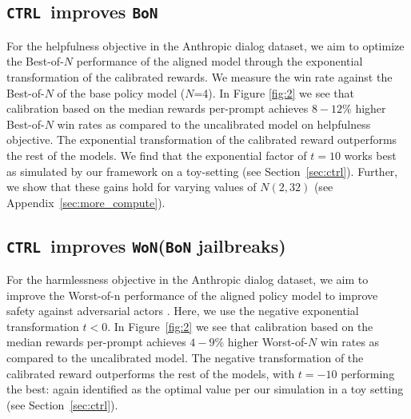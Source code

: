 \documentclass{article}
\newcommand{\ctrl}{\texttt{CTRL}\xspace}
\newcommand{\bofn}{\texttt{BoN}\xspace}
\newcommand{\wofn}{\texttt{WoN}\xspace}
\begin{document}
%
%
\subsection{\ctrl\ improves \bofn}
%
For the helpfulness objective in the Anthropic dialog dataset, we aim to optimize the Best-of-$N$ performance of the aligned model through the exponential transformation of the calibrated rewards. We measure the win rate against the Best-of-$N$ of the base policy model ($N$=4). In Figure \ref{fig:2} we see that calibration based on the median rewards per-prompt achieves $8-12\%$ higher Best-of-$N$ win rates as compared to the uncalibrated model on helpfulness objective. The  exponential transformation of the calibrated reward outperforms the rest of the models. We find that the exponential factor of $t=10$ works best as simulated by our framework on a toy-setting (see Section~\ref{sec:ctrl}). Further, we show that these gains hold for varying values of $N (2, 32)$ (see Appendix~\ref{sec:more_compute}).

\subsection{\ctrl\ improves \wofn (\bofn jailbreaks)}
For the harmlessness objective in the Anthropic dialog dataset, we aim to improve the Worst-of-n performance of the aligned policy model to improve safety against adversarial actors \citep{hughes2024bestofnjailbreaking}. Here, we use the negative exponential transformation $t<0$. In Figure~\ref{fig:2} we see that calibration based on the median rewards per-prompt achieves $4-9\%$ higher Worst-of-$N$ win rates as compared to the uncalibrated model. The negative transformation of the calibrated reward outperforms the rest of the models, with $t=-10$ performing the best: again identified as the optimal value per our simulation in a toy setting (see Section~\ref{sec:ctrl}).
%
\end{document}
